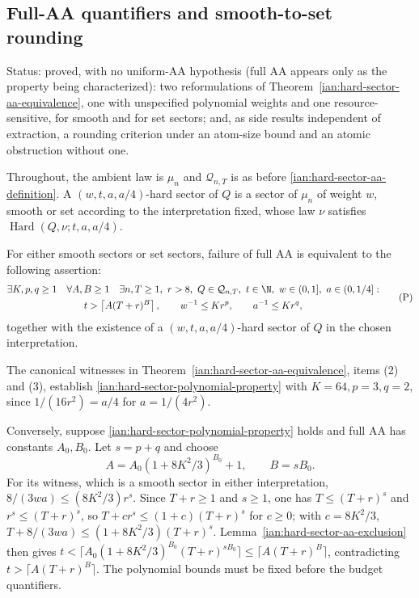 \subsection{Full-AA quantifiers and smooth-to-set rounding}
\label{ian:hard-sector-sets-asymptotics}

Status: proved, with no uniform-AA hypothesis (full AA appears only as the property being characterized): two reformulations of Theorem~\ref{ian:hard-sector-aa-equivalence}, one with unspecified polynomial weights and one resource-sensitive, for smooth and for set sectors; and, as side results independent of extraction, a rounding criterion under an atom-size bound and an atomic obstruction without one.

Throughout, the ambient law is \(\mu_n\) and \(\mathcal Q_{n,T}\) is as
before \eqref{ian:hard-sector-aa-definition}. A
\((w,t,a,a/4)\)-hard sector of \(Q\) is a sector of \(\mu_n\) of weight
\(w\), smooth or set according to the interpretation fixed, whose law
\(\nu\) satisfies \(\operatorname{Hard}(Q,\nu;t,a,a/4)\).

\begin{remark}
\label{ian:hard-sector-polynomial-quantifiers}
For either smooth sectors or set sectors, failure of full AA is
equivalent to the following assertion:
\[
 \begin{gathered}
 \exists K,p,q\ge1\quad\forall A,B\ge1\quad
 \exists n,T\ge1,\ r>8,\ Q\in\mathcal Q_{n,T},\
 t\in\N,\ w\in(0,1],\ a\in(0,1/4]:\\
 t>\left\lceil A(T+r)^B\right\rceil,\qquad
 w^{-1}\le Kr^p,\qquad a^{-1}\le Kr^q,
 \end{gathered}
 \tag{P}\label{ian:hard-sector-polynomial-property}
\]
together with the existence of a \((w,t,a,a/4)\)-hard sector of \(Q\) in
the chosen interpretation.

The canonical witnesses in
Theorem~\ref{ian:hard-sector-aa-equivalence}, items (2) and (3),
establish \eqref{ian:hard-sector-polynomial-property} with
\(K=64,p=3,q=2\), since \(1/(16r^2)=a/4\) for \(a=1/(4r^2)\).

Conversely, suppose \eqref{ian:hard-sector-polynomial-property} holds
and full AA has constants \(A_0,B_0\). Let \(s=p+q\) and choose
\[
 A=A_0(1+8K^2/3)^{B_0}+1,\qquad B=sB_0.
\]
For its witness, which is a smooth sector in either interpretation,
\(8/(3wa)\le(8K^2/3)r^s\). Since \(T+r\ge1\) and \(s\ge1\), one has
\(T\le(T+r)^s\) and \(r^s\le(T+r)^s\), so
\(T+cr^s\le(1+c)(T+r)^s\) for \(c\ge0\); with \(c=8K^2/3\),
\(T+8/(3wa)\le(1+8K^2/3)(T+r)^s\). Lemma~\ref{ian:hard-sector-aa-exclusion}
then gives
\(t<\lceil A_0(1+8K^2/3)^{B_0}(T+r)^{sB_0}\rceil\le\lceil A(T+r)^B\rceil\),
contradicting \(t>\lceil A(T+r)^B\rceil\). The polynomial bounds must be
fixed before the budget quantifiers.
\end{remark}

